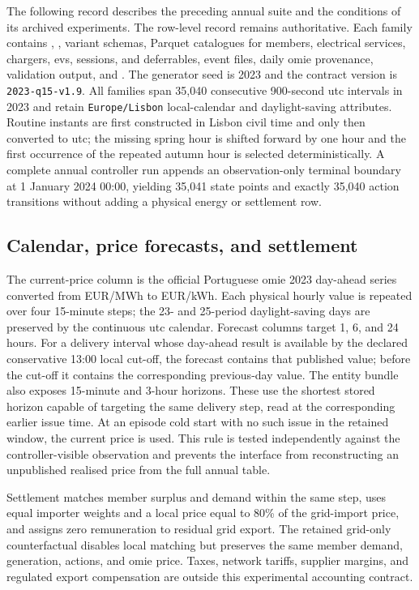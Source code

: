 The following record describes the preceding annual suite and the conditions of its archived experiments. The row-level record remains authoritative. Each family contains , , variant schemas, Parquet catalogues for members, electrical services, chargers, \glspl{ev}, sessions, and deferrables, event files, daily \gls{omie} provenance, validation output, and . The generator seed is 2023 and the contract version is \texttt{2023-q15-v1.9}. All families span 35,040 consecutive 900-second \gls{utc} intervals in 2023 and retain \texttt{Europe/Lisbon} local-calendar and daylight-saving attributes. Routine instants are first constructed in Lisbon civil time and only then converted to \gls{utc}; the missing spring hour is shifted forward by one hour and the first occurrence of the repeated autumn hour is selected deterministically. A complete annual controller run appends an observation-only terminal boundary at 1 January 2024 00:00, yielding 35,041 state points and exactly 35,040 action transitions without adding a physical energy or settlement row.

\subsection{Calendar, price forecasts, and settlement}

The current-price column is the official Portuguese \gls{omie} 2023 day-ahead series converted from EUR/MWh to EUR/kWh. Each physical hourly value is repeated over four 15-minute steps; the 23- and 25-period daylight-saving days are preserved by the continuous \gls{utc} calendar. Forecast columns target 1, 6, and 24 hours. For a delivery interval whose day-ahead result is available by the declared conservative 13:00 local cut-off, the forecast contains that published value; before the cut-off it contains the corresponding previous-day value. The entity bundle also exposes 15-minute and 3-hour horizons. These use the shortest stored horizon capable of targeting the same delivery step, read at the corresponding earlier issue time. At an episode cold start with no such issue in the retained window, the current price is used. This rule is tested independently against the controller-visible observation and prevents the interface from reconstructing an unpublished realised price from the full annual table.

Settlement matches member surplus and demand within the same step, uses equal importer weights and a local price equal to 80\% of the grid-import price, and assigns zero remuneration to residual grid export. The retained grid-only counterfactual disables local matching but preserves the same member demand, generation, actions, and \gls{omie} price. Taxes, network tariffs, supplier margins, and regulated export compensation are outside this experimental accounting contract.

